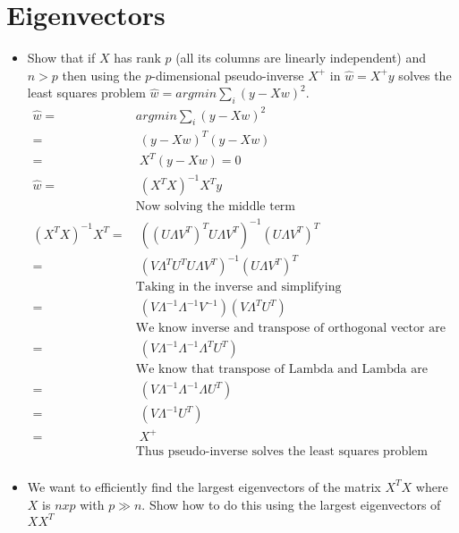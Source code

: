 \section{Eigenvectors}

\begin{itemize}
\item {} 
Show that if $X$ has rank $p$ (all its columns are linearly independent) and $n > p$ 
then using the $p$-dimensional pseudo-inverse $X^+$ in $\hat{w} = X^+ y$ solves the least squares problem
$\hat{w} = argmin \sum_i (y - Xw)^2$.
\begin{align*}
\hat{w} =& argmin \sum_i (y - Xw)^2\\
	   =& \; (y - Xw)^T (y - Xw) \\
	   =&\; X^T (y - Xw) = 0 \\
\hat{w} =&\; (X^T X)^{-1} X^T y \\
& \text{Now solving the middle term }\\
(X^T X)^{-1} X^T = &\; ((U \Lambda V^{T})^{T} U \Lambda V^T )^{-1} (U \Lambda V^T)^T \\
	=&\; (V \Lambda^T U^T U \Lambda V^T)^{-1} (U \Lambda V^T)^T \\
	& \text{Taking in the inverse and simplifying } \\
	=&\; (V \Lambda^{-1} \Lambda^{-1} V^{-1}) (V \Lambda^T U^T) \\
	& \text{We know inverse and transpose of orthogonal vector are the same} \\
	=&\; (V \Lambda^{-1} \Lambda^{-1} \Lambda^{T} U^{T}) \\
	& \text{We know that transpose of Lambda and Lambda are same as it is a symmetric diagonal matrix} \\
	=&\; (V \Lambda^{-1} \Lambda^{-1} \Lambda U^{T} ) \\
	=&\; (V \Lambda^{-1} U^{T}) \\
	=&\; X^{+} \\
	&\text{Thus pseudo-inverse solves the least squares problem} \\
\end{align*}

\item {} 
We want to efficiently find the largest eigenvectors of the matrix $X^TX$ where  $X$ is $n x p$ with $p \gg n$.
Show how to do this using the largest eigenvectors of $XX^T$ \\



\end{itemize}
